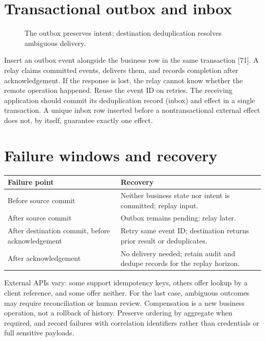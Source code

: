 \section{Transactional outbox and inbox}
\begin{figure}[!htbp]\centering
{}
\caption{The outbox preserves intent; destination deduplication resolves ambiguous delivery.}
\end{figure}
Insert an outbox event alongside the business row in the same transaction
[71]. A relay claims committed events, delivers them, and records completion
after acknowledgement. If the response is lost, the relay cannot know
whether the remote operation happened. Reuse the event ID on retries.
The receiving application should commit its deduplication record (inbox)
and effect in a single transaction. A unique inbox row inserted before a
nontransactional external effect does not, by itself, guarantee exactly
one effect.

\section{Failure windows and recovery}
\begin{longtable}{L{.34\linewidth}L{.58\linewidth}}
\toprule Failure point & Recovery \\ \midrule\endhead
Before source commit & Neither business state nor intent is committed; replay input. \\
After source commit & Outbox remains pending; relay later. \\
After destination commit, before acknowledgement & Retry same event ID; destination returns prior result or deduplicates. \\
After acknowledgement & No delivery needed; retain audit and dedupe records for the replay horizon. \\
\bottomrule
\end{longtable}
External APIs vary: some support idempotency keys, others offer lookup by a
client reference, and some offer neither. For the last case, ambiguous
outcomes may require reconciliation or human review. Compensation is a new
business operation, not a rollback of history. Preserve ordering by
aggregate when required, and record failures with correlation identifiers
rather than credentials or full sensitive payloads.

